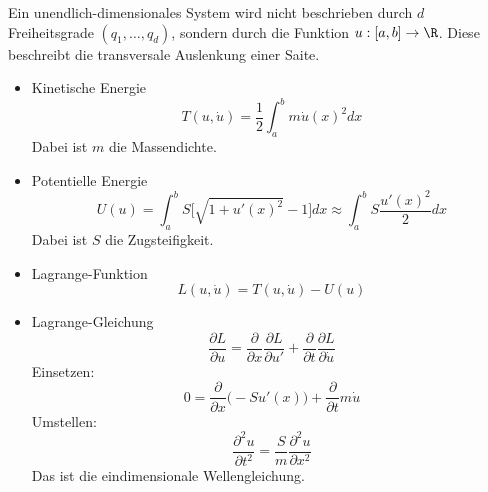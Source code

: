 \begin{bsp}
	Ein unendlich-dimensionales System wird nicht beschrieben durch $d$
	Freiheitsgrade $(q_1, \dots, q_d)$, sondern durch die Funktion $u: [a, b] \to \R$. Diese beschreibt die transversale Auslenkung einer Saite.
	\begin{itemize}
		\item Kinetische Energie
		\begin{equation*}
		T(u, \dot u) = \frac12 \int_a^b m \dot u(x)^2 dx
		\end{equation*}
		Dabei ist $m$ die Massendichte.
		\item Potentielle Energie
		\begin{equation*}
		U(u)
		=
		\int_a^b S \Big[ \sqrt{1+ u'(x)^2} -1 \Big] dx
		\approx
		\int_a^b S\frac{u'(x)^2}{2} dx
		\end{equation*}
		Dabei ist $S$ die Zugsteifigkeit.
		\item Lagrange-Funktion
		\begin{equation*}
		L(u, \dot u) = T(u, \dot u) - U(u)
		\end{equation*}
		\item Lagrange-Gleichung
		\begin{equation*}
		\frac{\partial L}{\partial u}
		=
		\frac{\partial}{\partial x} \frac{\partial L}{\partial u'}
		+ \frac{\partial}{\partial t} \frac{\partial L}{\partial \dot{u}}
		\end{equation*}
		Einsetzen:
		\begin{equation*}
		0 =
		\frac{\partial}{\partial x} \Big(- S u'(x)\Big)
		+ \frac{\partial}{\partial t}m\dot{u}
		\end{equation*}
		Umstellen:
		\begin{equation*}
		\frac{\partial^2 u}{\partial t^2} = \frac{S}{m} \frac{\partial^2 u}{\partial x^2}
		\end{equation*}
		Das ist die eindimensionale Wellengleichung.
	\end{itemize}
\end{bsp}


